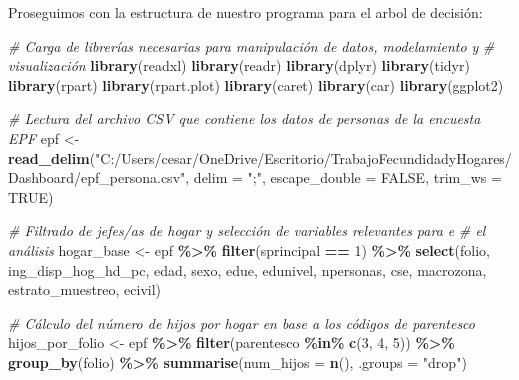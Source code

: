 \documentclass[
]{article}
\newenvironment{Shaded}{\begin{snugshade}}{\end{snugshade}}
\newcommand{\AttributeTok}[1]{\textcolor[rgb]{0.13,0.29,0.53}{#1}}
\newcommand{\CommentTok}[1]{\textcolor[rgb]{0.56,0.35,0.01}{\textit{#1}}}
\newcommand{\ConstantTok}[1]{\textcolor[rgb]{0.56,0.35,0.01}{#1}}
\newcommand{\DecValTok}[1]{\textcolor[rgb]{0.00,0.00,0.81}{#1}}
\newcommand{\FunctionTok}[1]{\textcolor[rgb]{0.13,0.29,0.53}{\textbf{#1}}}
\newcommand{\NormalTok}[1]{#1}
\newcommand{\OtherTok}[1]{\textcolor[rgb]{0.56,0.35,0.01}{#1}}
\newcommand{\SpecialCharTok}[1]{\textcolor[rgb]{0.81,0.36,0.00}{\textbf{#1}}}
\newcommand{\StringTok}[1]{\textcolor[rgb]{0.31,0.60,0.02}{#1}}
\begin{document}
Proseguimos con la estructura de nuestro programa para el arbol de
decisión:

\begin{Shaded}
\begin{Highlighting}[]
\CommentTok{\# Carga de librerías necesarias para manipulación de datos, modelamiento y }
\CommentTok{\# visualización}
\FunctionTok{library}\NormalTok{(readxl)}
\FunctionTok{library}\NormalTok{(readr)}
\FunctionTok{library}\NormalTok{(dplyr)}
\FunctionTok{library}\NormalTok{(tidyr)}
\FunctionTok{library}\NormalTok{(rpart)}
\FunctionTok{library}\NormalTok{(rpart.plot)}
\FunctionTok{library}\NormalTok{(caret)}
\FunctionTok{library}\NormalTok{(car)}
\FunctionTok{library}\NormalTok{(ggplot2)}

\CommentTok{\# Lectura del archivo CSV que contiene los datos de personas de la encuesta EPF}
\NormalTok{epf }\OtherTok{\textless{}{-}} \FunctionTok{read\_delim}\NormalTok{(}\StringTok{"C:/Users/cesar/OneDrive/Escritorio/TrabajoFecundidadyHogares/Dashboard/epf\_persona.csv"}\NormalTok{, }\AttributeTok{delim =} \StringTok{";"}\NormalTok{,}
                  \AttributeTok{escape\_double =} \ConstantTok{FALSE}\NormalTok{, }\AttributeTok{trim\_ws =} \ConstantTok{TRUE}\NormalTok{)}

\CommentTok{\# Filtrado de jefes/as de hogar y selección de variables relevantes para e}
\CommentTok{\# el análisis}
\NormalTok{hogar\_base }\OtherTok{\textless{}{-}}\NormalTok{ epf }\SpecialCharTok{\%\textgreater{}\%}
  \FunctionTok{filter}\NormalTok{(sprincipal }\SpecialCharTok{==} \DecValTok{1}\NormalTok{) }\SpecialCharTok{\%\textgreater{}\%}
  \FunctionTok{select}\NormalTok{(folio, ing\_disp\_hog\_hd\_pc, edad, sexo, edue, edunivel,}
\NormalTok{         npersonas, cse, macrozona, estrato\_muestreo, ecivil)}

\CommentTok{\# Cálculo del número de hijos por hogar en base a los códigos de parentesco}
\NormalTok{hijos\_por\_folio }\OtherTok{\textless{}{-}}\NormalTok{ epf }\SpecialCharTok{\%\textgreater{}\%}
  \FunctionTok{filter}\NormalTok{(parentesco }\SpecialCharTok{\%in\%} \FunctionTok{c}\NormalTok{(}\DecValTok{3}\NormalTok{, }\DecValTok{4}\NormalTok{, }\DecValTok{5}\NormalTok{)) }\SpecialCharTok{\%\textgreater{}\%}
  \FunctionTok{group\_by}\NormalTok{(folio) }\SpecialCharTok{\%\textgreater{}\%}
  \FunctionTok{summarise}\NormalTok{(}\AttributeTok{num\_hijos =} \FunctionTok{n}\NormalTok{(), }\AttributeTok{.groups =} \StringTok{"drop"}\NormalTok{)}


\end{Highlighting}
\end{Shaded}
\end{document}
